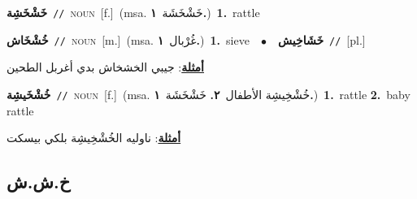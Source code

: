\documentclass[10pt,a4paper,twoside]{article} %
\begin{document}
\begin{multicols}{2}
{\setlength\topsep{0pt}\textbf{\foreignlanguage{arabic}{خَشْخَشِة}}\ {\color{gray}\texttt{//}\color{black}}\ \textsc{noun}\ [f.]\ \color{gray}(msa. \foreignlanguage{arabic}{خَشْخَشَة}~\foreignlanguage{arabic}{\textbf{١.}})\color{black}\ \textbf{1.}~rattle\ } \vspace{2mm}

{\setlength\topsep{0pt}\textbf{\foreignlanguage{arabic}{خُشْخَاش}}\ {\color{gray}\texttt{//}\color{black}}\ \textsc{noun}\ [m.]\ \color{gray}(msa. \foreignlanguage{arabic}{غُرْبال}~\foreignlanguage{arabic}{\textbf{١.}})\color{black}\ \textbf{1.}~sieve\ \ $\bullet$\ \ \setlength\topsep{0pt}\textbf{\foreignlanguage{arabic}{خَشَاخِيش}}\ {\color{gray}\texttt{//}\color{black}}\ [pl.]\  \begin{flushright}\color{gray}\foreignlanguage{arabic}{\textbf{\underline{\foreignlanguage{arabic}{أمثلة}}}: جيبي الخشخاش بدي أغربل الطحين}\end{flushright}\color{black}} \vspace{2mm}

{\setlength\topsep{0pt}\textbf{\foreignlanguage{arabic}{خُشْخَيشِة}}\ {\color{gray}\texttt{//}\color{black}}\ \textsc{noun}\ [f.]\ \color{gray}(msa. \foreignlanguage{arabic}{خُشْخِيشِة الأطفال}~\foreignlanguage{arabic}{\textbf{٢.}}  \foreignlanguage{arabic}{خَشْخَشَة}~\foreignlanguage{arabic}{\textbf{١.}})\color{black}\ \textbf{1.}~rattle  \textbf{2.}~baby rattle\  \begin{flushright}\color{gray}\foreignlanguage{arabic}{\textbf{\underline{\foreignlanguage{arabic}{أمثلة}}}: ناوليه الخُشْخِيشِة بلكي بيسكت}\end{flushright}\color{black}} \vspace{2mm}

\vspace{-3mm}
\subsection*{\color{blue}\foreignlanguage{arabic}{خ.ش.ش}\color{blue}{}} 


\end{multicols}
\end{document}
